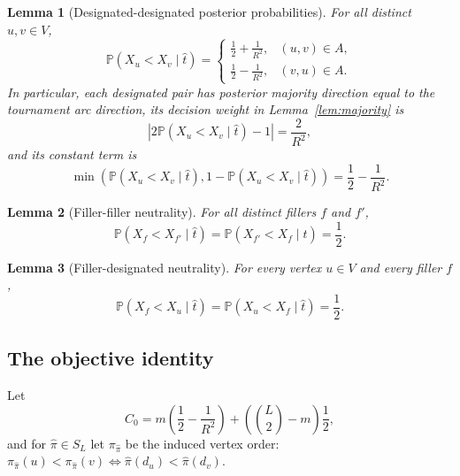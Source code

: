 \documentclass[11pt]{article}
\newtheorem{lemma}{Lemma}
\newcommand{\Prb}{\mathbb{P}}
\begin{document}
\begin{lemma}[Designated-designated posterior probabilities]\label{lem:designated}
For all distinct $u,v\in V$,
\begin{equation}
  \Prb(X_u<X_v\mid \hat t)
  =
  \begin{cases}
    \displaystyle \frac12+\frac1{R^2}, & (u,v)\in A,\\[6pt]
    \displaystyle \frac12-\frac1{R^2}, & (v,u)\in A.
  \end{cases}
\end{equation}
In particular, each designated pair has posterior majority direction equal to the tournament arc direction, its decision weight in Lemma~\ref{lem:majority} is
\begin{equation}
  \left|2\Prb(X_u<X_v\mid \hat t)-1\right|=\frac2{R^2},
\end{equation}
and its constant term is
\begin{equation}
  \min\left(\Prb(X_u<X_v\mid \hat t),1-\Prb(X_u<X_v\mid \hat t)\right)
  =\frac12-\frac1{R^2}.
\end{equation}
\end{lemma}

\begin{lemma}[Filler-filler neutrality]\label{lem:fillerfiller}
For all distinct fillers $f$ and $f'$,
\begin{equation}
  \Prb(X_f<X_{f'}\mid \hat t)=\Prb(X_{f'}<X_f\mid \hat t)=\frac12 .
\end{equation}
\end{lemma}

\begin{lemma}[Filler-designated neutrality]\label{lem:fillerdesignated}
For every vertex $u\in V$ and every filler $f$,
\begin{equation}
  \Prb(X_f<X_u\mid \hat t)=\Prb(X_u<X_f\mid \hat t)=\frac12 .
\end{equation}
\end{lemma}

\subsection*{The objective identity}

Let
\begin{equation}
  C_0=m\left(\frac12-\frac1{R^2}\right)+\left(\binom L2-m\right)\frac12,
\end{equation}
and for $\hat\pi\in S_L$ let $\pi_{\hat\pi}$ be the induced vertex order: $\pi_{\hat\pi}(u)<\pi_{\hat\pi}(v)\iff\hat\pi(d_u)<\hat\pi(d_v)$.
\end{document}
